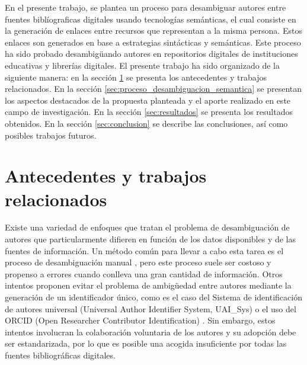 \documentclass[conference]{IEEEtran}
\begin{document}
En el presente trabajo, se plantea un proceso para desambiguar autores entre fuentes biblíograficas digitales usando tecnologías semánticas, el cual consiste en la generación de enlaces \cite{bizer2009linked} entre recursos que representan a la misma persona. Estos enlaces son generados en base a estrategias sintácticas y semánticas. Este proceso ha sido probado desambigüando autores en repositorios digitales de instituciones educativas y librerías digitales. El presente trabajo ha sido organizado de la siguiente manera: en la sección \ref{sec:antecedentes_trabajos_relacionados} se presenta los antecedentes y trabajos relacionados. En la sección \ref{sec:proceso_desambiguacion_semantica} se presentan los aspectos destacados de la  propuesta planteada y el aporte realizado en este campo de investigación. En la sección \ref{sec:resultados}  se presenta los resultados obtenidos. En la sección \ref{sec:conclusion} se  describe las conclusiones, así como posibles trabajos futuros.

\section{Antecedentes y trabajos relacionados}
\label{sec:antecedentes_trabajos_relacionados}
Existe una variedad de enfoques que tratan el problema de desambiguación de autores que particularmente difieren en función de los datos disponibles y de las fuentes de información. Un método común para llevar a cabo esta tarea es el proceso de desambiguación manual \cite{doi:10.1300/J115v22n04_01}, pero este proceso suele ser costoso y propenso a errores cuando conlleva una gran cantidad de información. Otros intentos proponen evitar el problema de ambigüedad entre autores  mediante la generación de un identificador único, como es el caso del Sistema de identificación de autores universal (Universal Author Identifier System, UAI\_Sys) \cite{Dervos2007TheUA} o el uso del ORCID (Open Researcher Contributor Identification) \cite{Haak2012ORCIDAS}. Sin embargo, estos intentos involucran la colaboración voluntaria  de los autores y su adopción debe ser estandarizada, por lo que es posible una acogida insuficiente por todas las fuentes bibliográficas digitales. 
\end{document}
